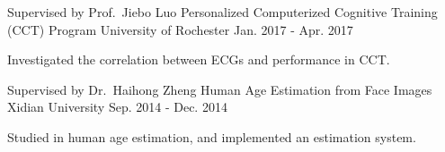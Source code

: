 
\begin{cventries}

  \cventry
    {Supervised by Prof.\ Jiebo Luo} %
    {Personalized Computerized Cognitive Training (CCT) Program} %
    {University of Rochester} %
    {Jan. 2017 - Apr. 2017} %
    {
      \begin{cvitems} %
        \item {Investigated the correlation between ECGs and performance in CCT.}
      \end{cvitems}
    }

  \cventry
    {Supervised by Dr.\ Haihong Zheng} %
    {Human Age Estimation from Face Images} %
    {Xidian University} %
    {Sep. 2014 - Dec. 2014} %
    {
      \begin{cvitems} %
        \item {Studied in human age estimation, and implemented an estimation system.}
      \end{cvitems}
    }

\end{cventries}
